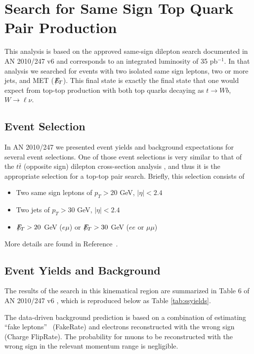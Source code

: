 \section{Search for Same Sign Top Quark Pair Production}
\label{sec:samesign}

This analysis is based on the approved same-sign dilepton search documented in AN 2010/247 v6 \cite{ssnote1}
and corresponds to an integrated luminosity of 35 pb$^{-1}$.
In that analysis we searched for events with two isolated same sign leptons, two or more jets, and MET ($E\!\!\!\!/_T$).
This final state is exactly the final state that one would expect from top-top production with 
both top quarks decaying as $t\rightarrow Wb$, $W\rightarrow \ell \nu$.

\subsection{Event Selection}

In AN 2010/247 we presented event yields and background expectations for several event selections.  
One of those event selections is very similar to that of the $t\bar{t}$ (opposite sign) dilepton 
cross-section analysis \cite{topxsection}, 
and thus it is the appropriate selection for a top-top pair search.  
Briefly, this selection consists of

\begin{itemize}
	\item Two same sign leptons of $p_T>20$ GeV, $|\eta|<2.4$
	\item Two jets of $p_T>30$ GeV, $|\eta|<2.4$
	\item $E\!\!\!\!/_T >20$ GeV ($e\mu$) or $E\!\!\!\!/_T>30$ GeV ($ee$ or $\mu\mu$)
\end{itemize}

\noindent More details are found in Reference~\cite{ssnote1}.

\subsection{Event Yields and Background}
\label{sec:ssyields}

The results of the search in this kinematical region are 
summarized in Table 6 of AN 2010/247 v6 \cite{ssnote1}, 
which is reproduced below as Table \ref{tab:ssyields}.

The data-driven background prediction is based on a combination 
of estimating ``fake leptons''~\cite{fakenote} (FakeRate) 
and electrons reconstructed with the wrong sign~\cite{ssnote1} (Charge FlipRate). 
The probability for muons to be reconstructed with the wrong sign 
in the relevant momentum range is negligible.


